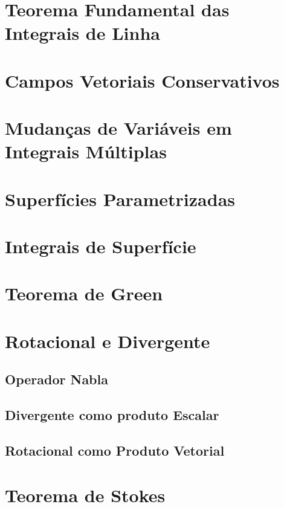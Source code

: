\section{Teorema Fundamental das Integrais de Linha}

\section{Campos Vetoriais Conservativos}

\section{Mudanças de Variáveis em Integrais Múltiplas}

\section{Superfícies Parametrizadas}

\section{Integrais de Superfície}

\section{Teorema de Green}

\section{Rotacional e Divergente}

\subsection{Operador Nabla}

\subsection{Divergente como produto Escalar}

\subsection{Rotacional como Produto Vetorial}

\section{Teorema de Stokes}



